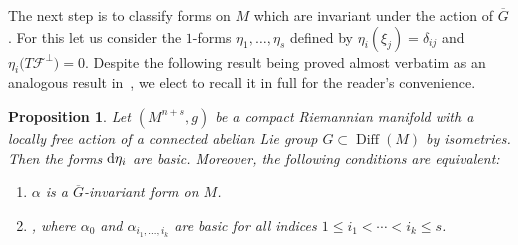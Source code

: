 \documentclass[10pt,a4paper]{amsart}
\numberwithin{equation}{section}
\newtheorem{prop}[tw]{Proposition}
\theoremstyle{definition}
\begin{document}
The next step is to classify forms on $M$ which are invariant under the action of $\overline{G}$. For this let us consider the $1$-forms $\eta_1,\dots,\eta_s$ defined by $\eta_i(\xi_j)=\delta_{ij}$ and $\eta_i\bigl(T\mathcal{F}^{\perp}\bigr)=0$. Despite the following result being proved almost verbatim as an analogous result in~\cite{My3}, we elect to recall it in full for the reader's convenience.

\begin{prop}\label{InvFor} Let $(M^{n+s},g)$ be a compact Riemannian manifold with a locally free action of a connected abelian Lie group $G\subset \operatorname{Diff}(M)$ by isometries. Then the forms ${\rm d}\eta_i$ are basic. Moreover, the following conditions are equivalent:
\begin{enumerate}\itemsep=0pt
\item[$(1)$] $\alpha$ is a $\overline{G}$-invariant form on $M$.
\item[$(2)$] , where $\alpha_0$ and $\alpha_{i_1,\dots,i_k}$ are basic for all indices $1\leq i_1<\cdots <i_k\leq s$.
\end{enumerate}
\end{prop}
\end{document}
